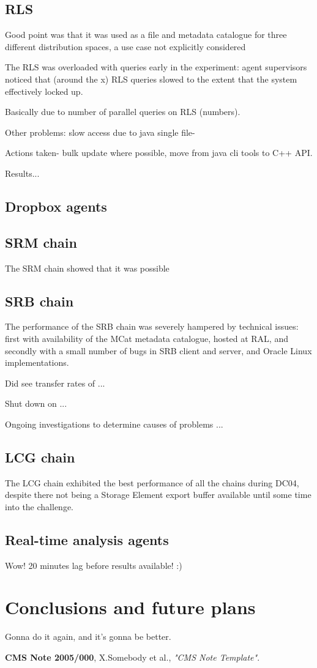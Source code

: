 \documentclass{cmspaper}
\begin{document}
\subsection{RLS}
Good point was that it was used as a file and metadata catalogue for three
different distribution spaces, a use case not explicitly considered

The RLS was overloaded with queries early in the experiment: agent supervisors
noticed that (around the x) RLS queries slowed to the extent that the system
effectively locked up.

Basically due to number of parallel queries on RLS (numbers).

Other problems: slow access due to java single file-

Actions taken- bulk update where possible, move from java cli tools to C++ API.

Results...

\subsection{Dropbox agents}

\subsection{SRM chain}
The SRM chain showed that it was possible

\subsection{SRB chain}
The performance of the SRB chain was severely hampered by technical issues:
first with availability of the MCat metadata catalogue, hosted at RAL, and
secondly with a small number of bugs in SRB client and server, and Oracle
Linux implementations.

Did see transfer rates of ...

Shut down on ...

Ongoing investigations to determine causes of problems ...

\subsection{LCG chain}
The LCG chain exhibited the best performance of all the chains during DC04,
despite there not being a Storage Element export buffer available until
some time into the challenge.

\subsection{Real-time analysis agents}
Wow! 20 minutes lag before results available! :)

\section{Conclusions and future plans}
Gonna do it again, and it's gonna be better.

\begin{thebibliography}{9}
   {\bf CMS Note 2005/000},
    X.Somebody et al.,
    {\em "CMS Note Template"}.
\end{thebibliography}
 
\end{document}
